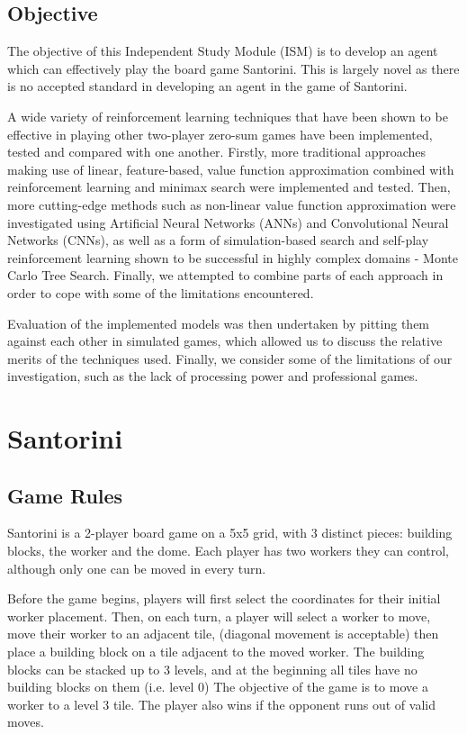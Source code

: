 \documentclass[a4paper,12pt,table]{article}
\begin{document}
\subsection{Objective}

The objective of this Independent Study Module (ISM) is to develop an agent which can effectively play the board game Santorini. This is largely novel as there is no accepted standard in developing an agent in the game of Santorini. \par

A wide variety of reinforcement learning techniques that have been shown to be effective in playing other two-player zero-sum games have been implemented, tested and compared with one another. Firstly, more traditional approaches making use of linear, feature-based, value function approximation combined with reinforcement learning and minimax search were implemented and tested. Then, more cutting-edge methods such as non-linear value function approximation were investigated using Artificial Neural Networks (ANNs) and Convolutional Neural Networks (CNNs), as well as a form of simulation-based search and self-play reinforcement learning shown to be successful in highly complex domains - Monte Carlo Tree Search. Finally, we attempted to combine parts of each approach in order to cope with some of the limitations encountered. \par

Evaluation of the implemented models was then undertaken by pitting them against each other in simulated games, which allowed us to discuss the relative merits of the techniques used. Finally, we consider some of the limitations of our investigation, such as the lack of processing power and professional games.

\section{Santorini}

\subsection{Game Rules}

Santorini is a 2-player board game on a 5x5 grid, with 3 distinct pieces: building blocks, the worker and the dome. Each player has two workers they can control, although only one can be moved in every turn. \par

Before the game begins, players will first select the coordinates for their initial worker placement. Then, on each turn, a player will select a worker to move, move their worker to an adjacent tile, (diagonal movement is acceptable) then place a building block on a tile adjacent to the moved worker. The building blocks can be stacked up to 3 levels, and at the beginning all tiles have no building blocks on them (i.e. level 0) The objective of the game is to move a worker to a level 3 tile. The player also wins if the opponent runs out of valid moves. \par
\end{document}
